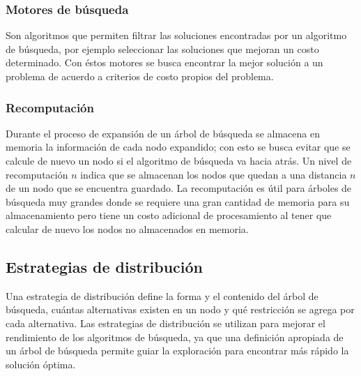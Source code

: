 \subsubsection{Motores de búsqueda}

Son algoritmos que permiten filtrar las soluciones encontradas por un algoritmo de búsqueda, por ejemplo seleccionar las soluciones que mejoran un costo determinado. Con éstos motores se busca encontrar la mejor solución a un problema de acuerdo a criterios de costo propios del problema.

\subsubsection{Recomputación}

Durante el proceso de expansión de un árbol de búsqueda\cite{MultiOZ} se almacena en memoria la información de cada nodo expandido; con esto se busca evitar que se calcule de nuevo un nodo si el algoritmo de búsqueda va hacia atrás. Un nivel de recomputación $n$ indica que se almacenan los nodos que quedan a una distancia $n$ de un nodo que se encuentra guardado. La recomputación es útil para árboles de búsqueda muy grandes donde se requiere una gran cantidad de memoria para su almacenamiento pero tiene un costo adicional de procesamiento al tener que calcular de nuevo los nodos no almacenados en memoria. 

\subsection{Estrategias de distribución}

Una estrategia de distribución\cite{RestriCurso} define la forma y el contenido del árbol de búsqueda, cuántas alternativas existen en un nodo y qué restricción se agrega por cada alternativa. Las estrategias de distribución se utilizan para mejorar el rendimiento de los algoritmos de búsqueda, ya que una definición apropiada de un árbol de búsqueda permite guiar la exploración para encontrar más rápido la solución óptima.



